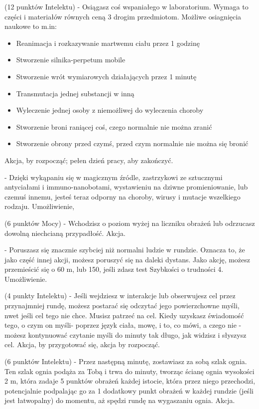 { (12 punktów Intelektu) - Osiągasz coś wspaniałego w laboratorium. Wymaga to części i materiałów równych ceną 3 drogim przedmiotom. Możliwe osiagnięcia naukowe to m.in:
\begin{itemize}
\item Reanimacja i rozkazywanie martwemu ciału przez 1 godzinę
\item Stworzenie silnika-perpetum mobile
\item Stworzenie wrót wymiarowych działających przez 1 minutę
\item Transmutacja jednej substancji w inną
\item Wyleczenie jednej osoby z niemożliwej do wyleczenia choroby
\item Stworzenie broni raniącej coś, czego normalnie nie można zranić
\item Stworzenie obrony przed czymś, przed czym normalnie nie można się bronić
\end{itemize}
Akcja, by rozpocząć; pełen dzień pracy, aby zakończyć.

 - Dzięki wykąpaniu się w magicznym źródle, zastrzykowi ze sztucznymi antyciałami i immuno-nanobotami, wystawieniu na dziwne promieniowanie, lub czemuś innemu, jesteś teraz odporny na choroby, wirusy i mutacje wszelkiego rodzaju. Umożliwienie, 

 (6 punktów Mocy) - Wchodzisz o poziom wyżej na liczniku obrażeń lub odrzucasz dowolną niechcianą przypadłość. Akcja.

 - Poruszasz się znacznie szybciej niż normalni ludzie w rundzie. Oznacza to, że jako część innej akcji, możesz poruszyć się na daleki dystans. Jako akcję, możesz przemieścić się o 60 m, lub 150, jeśli zdasz test Szybkości o trudności 4. Umożliwienie. 

 (4 punkty Intelektu) - Jeśli wejdziesz w interakcje lub obserwujesz cel przez przynajmniej rundę, możesz postarać się odczytać jego powierzchowne myśli, nwet jeśli cel tego nie chce. Musisz patrzeć na cel. Kiedy uzyskasz świadomość tego, o czym on myśli- poprzez język ciała, mowę, i to, co mówi, a czego nie - możesz kontynuować czytanie myśli do minuty tak długo, jak widzisz i słyszysz cel. Akcja, by przygotować się, akcja by rozpocząć. 

 (6 punktów Intelektu) - Przez następną minutę, zostawiasz za sobą szlak ognia. Ten szlak ognia podąża za Tobą i trwa do minuty, tworząc ścianę ognia wysokości 2 m, która zadaje 5 punktów obrażeń każdej istocie, która przez niego przechodzi, potencjalnie podpalając go za 1 dodatkowy punkt obrażeń w każdej rundzie (jeśli jest łatwopalny) do momentu, aż spędzi rundę na wygaszaniu ognia. Akcja.

}
